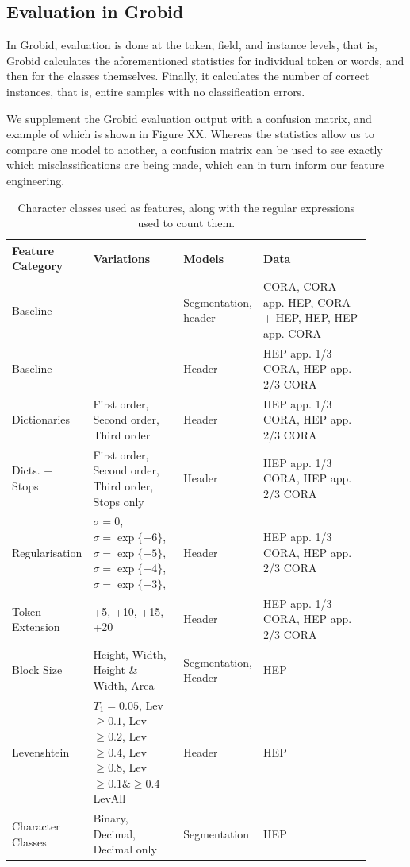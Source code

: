 \subsection{Evaluation in Grobid}

In Grobid, evaluation is done at the token, field, and instance levels, that is, Grobid calculates the aforementioned statistics for individual token or words, and then for the classes themselves. Finally, it calculates the number of correct instances, that is, entire samples with no classification errors.

We supplement the Grobid evaluation output with a confusion matrix, and example of which is shown in Figure XX. Whereas the statistics allow us to compare one model to another, a confusion matrix can be used to see exactly which misclassifications are being made, which can in turn inform our feature engineering.

\begin{table}[h]
\begin{center}
\begin{tabular}{ | p{0.2\linewidth} | p{0.25\linewidth} | p{0.15\linewidth} | p{0.3\linewidth} |}
\hline
Feature Category & Variations & Models & Data\\
\hline
Baseline & - & Segmentation, header & CORA, CORA app. HEP, CORA + HEP, HEP, HEP app. CORA \\
\hline
Baseline & - & Header & HEP app. 1/3 CORA, HEP app. 2/3 CORA \\
\hline
Dictionaries & First order, Second order, Third order & Header & HEP app. 1/3 CORA, HEP app. 2/3 CORA \\
\hline
Dicts. + Stops & First order, Second order, Third order, Stops only & Header & HEP app. 1/3 CORA, HEP app. 2/3 CORA \\
\hline
Regularisation & $\sigma=0$, $\sigma=\exp\{-6\}$,$\sigma=\exp\{-5\}$,$\sigma=\exp\{-4\}$,$\sigma=\exp\{-3\}$, & Header & HEP app. 1/3 CORA, HEP app. 2/3 CORA \\
\hline
Token Extension & +5, +10, +15, +20 & Header & HEP app. 1/3 CORA, HEP app. 2/3 CORA \\
\hline
Block Size & Height, Width, Height \& Width, Area & Segmentation, Header & HEP \\
\hline
Levenshtein & $T_1 = 0.05$, Lev$\geq0.1$, Lev$\geq0.2$, Lev$\geq0.4$, Lev$\geq0.8$, Lev$\geq0.1 \& \geq0.4$ LevAll & Header & HEP \\
\hline
Character Classes & Binary, Decimal, Decimal only & Segmentation & HEP \\
\hline
\end{tabular}
\caption[Character classes used as features, along with the regular expressions used to count them.]{Character classes used as features, along with the regular expressions used to count them.}
\label{table:experiments}
\end{center}
\end{table}

